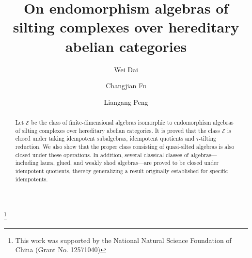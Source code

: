 \documentclass[12pt,a4paper,reqno]{amsart}
\theoremstyle{definition}
\renewcommand{\P}{\mathbb{P}}
\begin{document}
\title[On endomorphism algebras of silting complexes]{On endomorphism algebras of silting complexes over hereditary abelian categories}\thanks{This work was supported by the National Natural Science Foundation of China (Grant No. 12571040)}


\author[Dai]{Wei Dai}
\address{Wei Dai\\ Department of Mathematics\\SiChuan University\\610064 Chengdu\\P.R.China}

\author[Fu]{Changjian Fu}
\address{Changjian Fu\\Department of Mathematics\\SiChuan University\\610064 Chengdu\\P.R.China}

\author[Peng]{Liangang Peng}
\address{Liangang Peng\\Department of Mathematics\\SiChuan University\\610064 Chengdu\\P.R.China}


\begin{abstract}
Let $\mathcal{E}$ be the class of finite-dimensional algebras isomorphic to endomorphism algebras of silting complexes over hereditary abelian categories. It is proved that the class $\mathcal{E}$ is closed under taking  idempotent subalgebras, idempotent quotients and $\tau$-tilting reduction. We also show that the proper class consisting of quasi-silted algebras is also closed under these operations. In addition, several classical classes of algebras---including laura, glued, and weakly shod algebras---are  proved to be closed under idempotent quotients, thereby generalizing a result originally established for specific idempotents.
\end{abstract}

\maketitle

\end{document}
